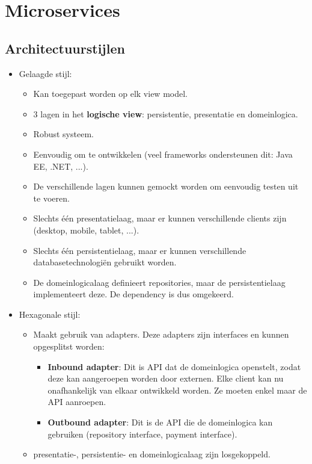 \part{Microservices}
	\chapter{Architectuurstijlen}
	\begin{itemize}
		\item[\info] Gelaagde stijl:
		\begin{itemize}
			\item[\info] Kan toegepast worden op elk view model.
			\item[\info] 3 lagen in het \textbf{logische view}: persistentie, presentatie en domeinlogica.
			\item[\good] Robust systeem.
			\item[\good] Eenvoudig om te ontwikkelen (veel frameworks ondersteunen dit: Java EE, .NET, ...).
			\item[\good] De verschillende lagen kunnen gemockt worden om eenvoudig testen uit te voeren.
			\item[\alert] Slechts één presentatielaag, maar er kunnen verschillende clients zijn (desktop, mobile, tablet, ...).
			\item[\alert] Slechts één persistentielaag, maar er kunnen verschillende databasetechnologiën gebruikt worden.
			\item[\alert] De domeinlogicalaag definieert repositories, maar de persistentielaag implementeert deze. De dependency is dus omgekeerd.
		\end{itemize}
		\item[\info] Hexagonale stijl:
		\begin{itemize}
			\item[\info] Maakt gebruik van adapters. Deze adapters zijn interfaces en kunnen opgesplitst worden:
			\begin{itemize}
				\item[\info] \textbf{Inbound adapter}: Dit is API dat de domeinlogica openstelt, zodat deze kan aangeroepen worden door externen. Elke client kan nu onafhankelijk van elkaar ontwikkeld worden. Ze moeten enkel maar de API aanroepen.
				\item[\info] \textbf{Outbound adapter}: Dit is de API die de domeinlogica kan gebruiken (repository interface, payment interface).
			\end{itemize}
			\item[\good] presentatie-, persistentie- en domeinlogicalaag zijn losgekoppeld.

\end{itemize}
\end{itemize}
